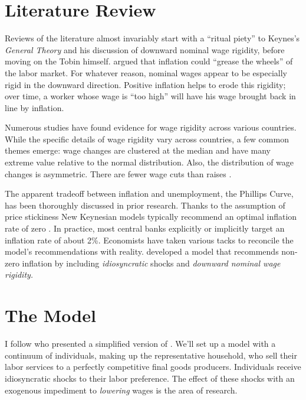 \documentclass[12pt,a4paper]{scrartcl}            %
\begin{document}
\section{Literature Review}
\label{sec:literature_review}
Reviews of the literature almost invariably start with a ``ritual piety'' \citep{tobin_1972} to Keynes's \emph{General Theory} and his discussion of downward nominal wage rigidity, before moving on the Tobin himself.
\cite{tobin_1972} argued that inflation could ``grease the wheels'' of the labor market.
For whatever reason, nominal wages appear to be especially rigid in the downward direction.
Positive inflation helps to erode this rigidity;
over time, a worker whose wage is ``too high'' will have his wage brought back in line by inflation.

Numerous studies have found evidence for wage rigidity across various countries.
While the specific details of wage rigidity vary across countries, a few common themes emerge:
wage changes are clustered at the median and have many extreme value relative to the normal distribution.  Also, the distribution of wage changes is asymmetric.  There are fewer wage cuts than raises \citep{dickens_et_al_2006}.

The apparent tradeoff between inflation and unemployment, the Phillips Curve, has been thoroughly discussed in prior research.
Thanks to the assumption of price stickiness New Keynesian models typically recommend an optimal inflation rate of zero \citep{schmitt-grohe_uribe_2010}.
In practice, most central banks explicitly or implicitly target an inflation rate of about 2\%.
Economists have taken various tacks to reconcile the model's recommendations with reality.
\cite{benigno_ricci_2011} developed a model that recommends non-zero inflation by including \emph{idiosyncratic} shocks and \emph{downward nominal wage rigidity.}

\section{The Model}
\label{sec:the_model}

I follow \cite{daly_hobijn_2013} who presented a simplified version of \cite{benigno_ricci_2011}.
We'll set up a model with a continuum of individuals, making up the representative household, who sell their labor services to a perfectly competitive final goods producers.
Individuals receive idiosyncratic shocks to their labor preference.
The effect of these shocks with an exogenous impediment to \emph{lowering} wages is the area of research.
\end{document}
